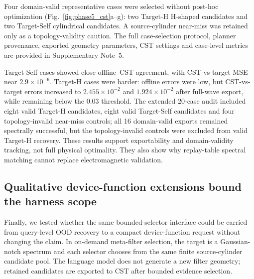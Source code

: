 \documentclass[final,1p,times]{elsarticle}
\begin{document}
Four domain-valid representative cases were selected without post-hoc optimization (Fig.~\ref{fig:phase5_cst}a--g): two Target-H H-shaped candidates and two Target-Self cylindrical candidates. A source-cylinder near-miss was retained only as a topology-validity caution. The full case-selection protocol, planner provenance, exported geometry parameters, CST settings and case-level metrics are provided in Supplementary Note~5.


Target-Self cases showed close offline--CST agreement, with CST-vs-target MSE near $2.9\times10^{-6}$. Target-H cases were harder: offline errors were low, but CST-vs-target errors increased to $2.455\times10^{-2}$ and $1.924\times10^{-2}$ after full-wave export, while remaining below the 0.03 threshold. The extended 20-case audit included eight valid Target-H candidates, eight valid Target-Self candidates and four topology-invalid near-miss controls; all 16 domain-valid exports remained spectrally successful, but the topology-invalid controls were excluded from valid Target-H recovery. These results support exportability and domain-validity tracking, not full physical optimality. They also show why replay-table spectral matching cannot replace electromagnetic validation.




\subsection{Qualitative device-function extensions bound the harness scope}

Finally, we tested whether the same bounded-selector interface could be carried from query-level OOD recovery to a compact device-function request without changing the claim. In on-demand meta-filter selection, the target is a Gaussian-notch spectrum and each selector chooses from the same finite source-cylinder candidate pool. The language model does not generate a new filter geometry; retained candidates are exported to CST after bounded evidence selection.
\end{document}
